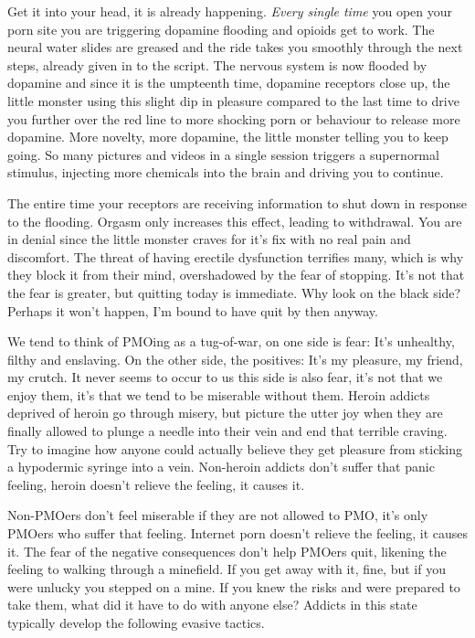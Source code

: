 Get it into your head, it is already happening. \textit{Every single time} you open your porn site you are triggering dopamine flooding and opioids get to work. The neural water slides are greased and the ride takes you smoothly through the next steps, already given in to the script. The nervous system is now flooded by dopamine and since it is the umpteenth time, dopamine receptors close up, the little monster using this slight dip in pleasure compared to the last time to drive you further over the red line to more shocking porn or behaviour to release more dopamine. More novelty, more dopamine, the little monster telling you to keep going. So many pictures and videos in a single session triggers a supernormal stimulus, injecting more chemicals into the brain and driving you to continue.

The entire time your receptors are receiving information to shut down in response to the flooding. Orgasm only increases this effect, leading to withdrawal. You are in denial since the little monster craves for it's fix with no real pain and discomfort. The threat of having erectile dysfunction terrifies many, which is why they block it from their mind, overshadowed by the fear of stopping. It's not that the fear is greater, but quitting today is immediate. Why look on the black side? Perhaps it won't happen, I'm bound to have quit by then anyway.

We tend to think of PMOing as a tug-of-war, on one side is fear: It's unhealthy, filthy and enslaving. On the other side, the positives: It's my pleasure, my friend, my crutch. It never seems to occur to us this side is also fear, it's not that we enjoy them, it's that we tend to be miserable without them. Heroin addicts deprived of heroin go through misery, but picture the utter joy when they are finally allowed to plunge a needle into their vein and end that terrible craving. Try to imagine how anyone could actually believe they get pleasure from sticking a hypodermic syringe into a vein. Non-heroin addicts don't suffer that panic feeling, heroin doesn't relieve the feeling, it causes it.

Non-PMOers don't feel miserable if they are not allowed to PMO, it's only PMOers who suffer that feeling. Internet porn doesn't relieve the feeling, it causes it. The fear of the negative consequences don't help PMOers quit, likening the feeling to walking through a minefield. If you get away with it, fine, but if you were unlucky you stepped on a mine. If you knew the risks and were prepared to take them, what did it have to do with anyone else? Addicts in this state typically develop the following evasive tactics.

